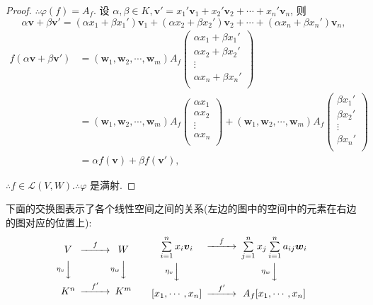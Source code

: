 \documentclass[color=black,device=normal,lang=cn,mode=geye]{elegantnote}
\begin{document}
\begin{proof}
    $\therefore\varphi(f)=A_f$. 设 $\alpha,\beta\in K,\boldsymbol{v}'=x_1'\boldsymbol{v}_1+x_2'\boldsymbol{v}_2+\cdots+x_n'\boldsymbol{v}_n$, 则
    \[\alpha\boldsymbol{v}+\beta\boldsymbol{v}'=(\alpha x_1+\beta x_1')\boldsymbol{v}_1+(\alpha x_2+\beta x_2')\boldsymbol{v}_2+\cdots+(\alpha x_n+\beta x_n')\boldsymbol{v}_n,\]
    \begin{align*}
        f(\alpha\boldsymbol{v}+\beta\boldsymbol{v}') & =(\boldsymbol{w}_1,\boldsymbol{w}_2,\cdots,\boldsymbol{w}_m)A_f\begin{pmatrix}
            \alpha x_1+\beta x_1' \\
            \alpha x_2+\beta x_2' \\
            \vdots \\
            \alpha x_n+\beta x_n' \\
        \end{pmatrix} \\
        & =(\boldsymbol{w}_1,\boldsymbol{w}_2,\cdots,\boldsymbol{w}_m)A_f\begin{pmatrix}
            \alpha x_1 \\
            \alpha x_2 \\
            \vdots \\
            \alpha x_n \\
        \end{pmatrix}+(\boldsymbol{w}_1,\boldsymbol{w}_2,\cdots,\boldsymbol{w}_m)A_f\begin{pmatrix}
            \beta x_1' \\
            \beta x_2' \\
            \vdots \\
            \beta x_n' \\
        \end{pmatrix} \\
        & =\alpha f(\boldsymbol{v})+\beta f(\boldsymbol{v}'),
    \end{align*}

    $\therefore f\in\mathcal{L}(V,W).\therefore\varphi$ 是满射.
\end{proof}

下面的交换图表示了各个线性空间之间的关系(左边的图中的空间中的元素在右边的图对应的位置上):
\[\begin{CD}
    V @>f>> W \\
    @V\eta_v VV @V\eta_w VV \\
    K^n @>f'>> K^m
\end{CD}\qquad
\begin{CD}
    \sum\limits_{i=1}^nx_i\boldsymbol{v}_i @>f>> \sum\limits_{j=1}^nx_j\sum\limits_{i=1}^na_{ij}\boldsymbol{w}_i \\
    @V\eta_v VV @V\eta_w VV \\
    [x_1,\cdots,x_n] @>f'>> A_f[x_1,\cdots,x_n]
\end{CD}\]
\end{document}
